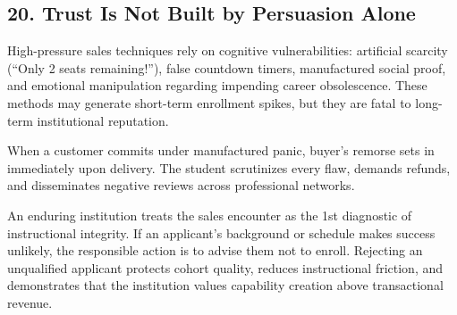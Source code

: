 \subsection*{20. Trust Is Not Built by Persuasion Alone}

High-pressure sales techniques rely on cognitive vulnerabilities: artificial scarcity (``Only 2 seats remaining!''), false countdown timers, manufactured social proof, and emotional manipulation regarding impending career obsolescence. These methods may generate short-term enrollment spikes, but they are fatal to long-term institutional reputation.

When a customer commits under manufactured panic, buyer's remorse sets in immediately upon delivery. The student scrutinizes every flaw, demands refunds, and disseminates negative reviews across professional networks. 

An enduring institution treats the sales encounter as the 1st diagnostic of instructional integrity. If an applicant's background or schedule makes success unlikely, the responsible action is to advise them not to enroll. Rejecting an unqualified applicant protects cohort quality, reduces instructional friction, and demonstrates that the institution values capability creation above transactional revenue.
